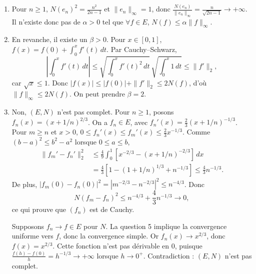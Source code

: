 \documentclass[11pt,a4paper]{article}
\begin{document}
\begin{enumerate}[label=\arabic*.,leftmargin=*,itemsep=1em]
\item Pour $n\geq1$, $N(e_n)^2=\frac{n^2}{2n-1}$ et $\|e_n\|_\infty=1$, donc $\frac{N(e_n)}{\|e_n\|_\infty}=\frac{n}{\sqrt{2n-1}}\to+\infty$. Il n'existe donc pas de $\alpha>0$ tel que $\forall f\in E$, $N(f)\leq\alpha\|f\|_\infty$.

\item En revanche, il existe un $\beta>0$. Pour $x\in[0,1]$, $f(x)=f(0)+\int_0^x f'(t)\,dt$. Par Cauchy--Schwarz,
\[
  \left|\int_0^x f'(t)\,dt\right|
  \leq\sqrt{\int_0^x f'(t)^2\,dt}\,\sqrt{\int_0^x1\,dt}
  \leq\|f'\|_2,
\]
car $\sqrt x\leq1$. Donc $|f(x)|\leq|f(0)|+\|f'\|_2\leq2N(f)$, d'où $\|f\|_\infty\leq2N(f)$. On peut prendre $\beta=2$.

\item Non, $(E,N)$ n'est pas complet. Pour $n\geq1$, posons $f_n(x)=(x+1/n)^{2/3}$. On a $f_n\in E$, avec $f_n'(x)=\frac23(x+1/n)^{-1/3}$. Pour $m\geq n$ et $x>0$, $0\leq f_n'(x)\leq f_m'(x)\leq\frac23x^{-1/3}$. Comme $(b-a)^2\leq b^2-a^2$ lorsque $0\leq a\leq b$,
\begin{align*}
  \|f_m'-f_n'\|_2^2
  &\leq\frac49\int_0^1\left[x^{-2/3}-(x+1/n)^{-2/3}\right]\,dx\\
  &=\frac43\left[1-(1+1/n)^{1/3}+n^{-1/3}\right]
  \leq\frac43n^{-1/3}.
\end{align*}
De plus, $|f_m(0)-f_n(0)|^2=|m^{-2/3}-n^{-2/3}|^2\leq n^{-4/3}$. Donc
\[
  N(f_m-f_n)^2\leq n^{-4/3}+\frac43n^{-1/3}\longrightarrow0,
\]
ce qui prouve que $(f_n)$ est de Cauchy.

Supposons $f_n\to f\in E$ pour $N$. La question 5 implique la convergence uniforme vers $f$, donc la convergence simple. Or $f_n(x)\to x^{2/3}$, donc $f(x)=x^{2/3}$. Cette fonction n'est pas dérivable en $0$, puisque $\frac{f(h)-f(0)}h=h^{-1/3}\to+\infty$ lorsque $h\to0^+$. Contradiction : $(E,N)$ n'est pas complet.
\end{enumerate}
\end{document}
